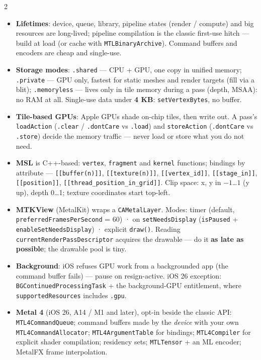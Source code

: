 \documentclass[8pt]{extarticle}
\newcommand\ct[1]{\texttt{#1}}
\newcommand\hd[1]{\par\vspace{3pt}\noindent{\bfseries\color{sheetBlue}#1}\par\vspace{1pt}}
\begin{document}
\begin{multicols}{2}
\raggedright{}

\hd{How it works}
\begin{itemize}
  \item \textbf{Lifetimes}: device, queue, library, pipeline states (render / compute) and big
        resources are long-lived; pipeline compilation is the classic first-use hitch — build at
        load (or cache with \ct{MTLBinaryArchive}). Command buffers and encoders are cheap and
        single-use.
  \item \textbf{Storage modes}: \ct{.shared} — CPU + GPU, one copy in unified memory;
        \ct{.private} — GPU only, fastest for static meshes and render targets (fill via a blit);
        \ct{.memoryless} — lives only in tile memory during a pass (depth, MSAA): no RAM at all.
        Single-use data under \textbf{4 KB}: \ct{setVertexBytes}, no buffer.
  \item \textbf{Tile-based GPUs}: Apple GPUs shade on-chip tiles, then write out. A pass's
        \ct{loadAction} (\ct{.clear} / \ct{.dontCare} vs \ct{.load}) and \ct{storeAction}
        (\ct{.dontCare} vs \ct{.store}) decide the memory traffic — never load or store what you
        do not need.
  \item \textbf{MSL} is C++-based: \ct{vertex}, \ct{fragment} and \ct{kernel} functions; bindings by
        attribute — \ct{[[buffer(n)]]}, \ct{[[texture(n)]]}, \ct{[[vertex\_id]]},
        \ct{[[stage\_in]]}, \ct{[[position]]}, \ct{[[thread\_position\_in\_grid]]}. Clip space: x, y in $-1$…$1$ (y up), depth 0…1;
        texture coordinates start top-left.
  \item \textbf{MTKView} (MetalKit) wraps a \ct{CAMetalLayer}. Modes: timer (default,
        \ct{preferredFramesPerSecond} = 60) · on \ct{setNeedsDisplay} (\ct{isPaused} +
        \ct{enableSetNeedsDisplay}) · explicit \ct{draw()}. Reading
        \ct{currentRenderPassDescriptor} acquires the drawable — do it \textbf{as late as
        possible}; the drawable pool is tiny.
  \item \textbf{Background}: iOS refuses GPU work from a backgrounded app (the command buffer
        fails) — pause on resign-active. iOS 26 exception:
        \ct{BGContinuedProcessingTask} + the background-GPU entitlement, where
        \ct{supportedResources} includes \ct{.gpu}.
  \item \textbf{Metal 4} (iOS 26, A14 / M1 and later), opt-in beside the classic API:
        \ct{MTL4CommandQueue}; command buffers made by the \emph{device} with your own
        \ct{MTL4CommandAllocator}; \ct{MTL4ArgumentTable} for bindings; \ct{MTL4Compiler} for
        explicit shader compilation; residency sets; \ct{MTLTensor} + an ML encoder; MetalFX
        frame interpolation.
\end{itemize}


\end{multicols}
\end{document}
